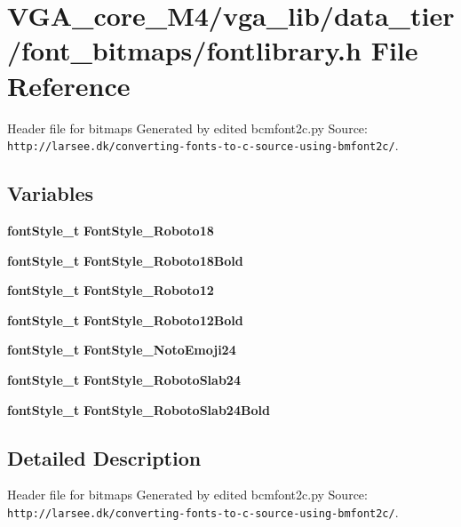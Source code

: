 \section{V\+G\+A\+\_\+core\+\_\+\+M4/vga\+\_\+lib/data\+\_\+tier/font\+\_\+bitmaps/fontlibrary.h File Reference}
\label{fontlibrary_8h}


Header file for bitmaps Generated by edited bcmfont2c.\+py Source\+: {\tt http\+://larsee.\+dk/converting-\/fonts-\/to-\/c-\/source-\/using-\/bmfont2c/}.  


\subsection*{Variables}
\begin{DoxyCompactItemize}
\item 
{\bf font\+Style\+\_\+t} {\bfseries Font\+Style\+\_\+\+Roboto18}\label{fontlibrary_8h_ad79a9faec72d4f5e8868205a077cb736}

\item 
{\bf font\+Style\+\_\+t} {\bfseries Font\+Style\+\_\+\+Roboto18\+Bold}\label{fontlibrary_8h_a9e84a3debfed6104fca08b961963fb8d}

\item 
{\bf font\+Style\+\_\+t} {\bfseries Font\+Style\+\_\+\+Roboto12}\label{fontlibrary_8h_ae5a0f825b093489511e3fdf3b0cfd78d}

\item 
{\bf font\+Style\+\_\+t} {\bfseries Font\+Style\+\_\+\+Roboto12\+Bold}\label{fontlibrary_8h_a1b17ef6b3590ca92e645558214788096}

\item 
{\bf font\+Style\+\_\+t} {\bfseries Font\+Style\+\_\+\+Noto\+Emoji24}\label{fontlibrary_8h_a853cef5f1e749e2a9da6ad440289798d}

\item 
{\bf font\+Style\+\_\+t} {\bfseries Font\+Style\+\_\+\+Roboto\+Slab24}\label{fontlibrary_8h_a1ded0a40c4e30e5c205ba5c1d7157e11}

\item 
{\bf font\+Style\+\_\+t} {\bfseries Font\+Style\+\_\+\+Roboto\+Slab24\+Bold}\label{fontlibrary_8h_af06d6a4b7878f7ddcaf37b6f72e2a921}

\end{DoxyCompactItemize}


\subsection{Detailed Description}
Header file for bitmaps Generated by edited bcmfont2c.\+py Source\+: {\tt http\+://larsee.\+dk/converting-\/fonts-\/to-\/c-\/source-\/using-\/bmfont2c/}. 


